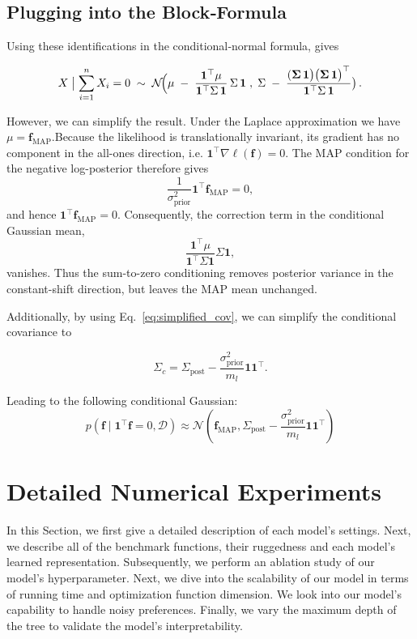 \documentclass{article}
\begin{document}
\subsection*{Plugging into the Block‐Formula}
Using these identifications in the conditional‐normal formula,
gives

$$
X\;\bigl|\;\sum_{i=1}^n X_i = 0
\;\sim\;
\mathcal{N}\!\Bigl(
\mu
\;-\;
\frac{ \mathbf{1}^\top\mu}{\mathbf{1}^\top\Sigma\,\mathbf{1}}\,\Sigma\,\mathbf{1}
\;,\;
\Sigma
\;-\;
\frac{\mathbf{(\Sigma\,\mathbf{1}\bigr)\bigl(\Sigma\,\mathbf{1}\bigr)^\top}}{\mathbf{1}^\top\Sigma\,\mathbf{1}}\bigr)
\,.
$$

However, we can simplify the result. Under the Laplace approximation we have \(\mu=\mathbf{f}_{\mathrm{MAP}}\).Because the likelihood is translationally invariant, its gradient has no component in the all-ones direction, i.e. \(\mathbf{1}^\top \nabla \ell(\mathbf{f})=0\). The MAP condition for the negative log-posterior therefore gives
\[
\frac{1}{\sigma_{\mathrm{prior}}^2}\mathbf{1}^\top \mathbf{f}_{\mathrm{MAP}}=0,
\]
and hence \(\mathbf{1}^\top \mathbf{f}_{\mathrm{MAP}}=0\). Consequently, the correction term in the conditional Gaussian mean,
\[
\frac{\mathbf{1}^\top \mu}{\mathbf{1}^\top \Sigma \mathbf{1}}\Sigma \mathbf{1},
\]
vanishes. Thus the sum-to-zero conditioning removes posterior variance in the constant-shift direction, but leaves the MAP mean unchanged.

Additionally, by using Eq.~\ref{eq:simplified_cov}, we can simplify the conditional covariance to

$$    \Sigma_c
    =
    \Sigma_{\mathrm{post}}
    -
    \frac{\sigma_{\mathrm{prior}}^2}{m_l}
    \mathbf{1}\mathbf{1}^{\top}.$$

Leading to the following conditional Gaussian:
\[
    \boxed{
    p(\mathbf{f}
    \mid
    \mathbf{1}^{\top}\mathbf{f}=0,\mathcal{D})
    \approx
    \mathcal{N}
    \left(
        \mathbf{f}_{\mathrm{MAP}},
        \Sigma_{\mathrm{post}}
        -
        \frac{\sigma_{\mathrm{prior}}^2}{m_l}
        \mathbf{1}\mathbf{1}^{\top}
    \right)
    }
\]
\section{Detailed Numerical Experiments}\label{appendix:experiments}
In this Section, we first give a detailed description of each model's settings. Next, we describe all of the benchmark functions, their ruggedness and each model's learned representation. Subsequently, we perform an ablation study of our model's hyperparameter. Next, we dive into the scalability of our model in terms of running time and optimization function dimension. We look into our model's capability to handle noisy preferences. Finally, we vary the maximum depth of the tree to validate the model's interpretability.
\end{document}
